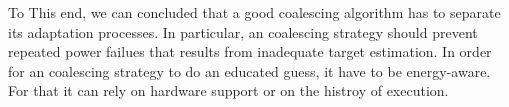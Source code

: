 To This end, we can concluded that a good coalescing algorithm has to separate its adaptation processes. In particular, an coalescing strategy should prevent repeated power failues that results from inadequate target estimation. In order for an coalescing strategy to do an educated guess, it have to be energy-aware. For that it can rely on hardware support or on the histroy of execution. 
